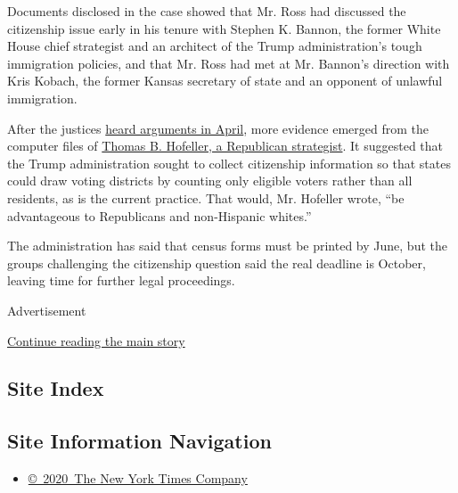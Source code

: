 Documents disclosed in the case showed that Mr. Ross had discussed the
citizenship issue early in his tenure with Stephen K. Bannon, the former
White House chief strategist and an architect of the Trump
administration's tough immigration policies, and that Mr. Ross had met
at Mr. Bannon's direction with Kris Kobach, the former Kansas secretary
of state and an opponent of unlawful immigration.

After the justices
\href{https://www.nytimes3xbfgragh.onion/2019/04/23/us/politics/supreme-court-census-citizenship.html}{heard
arguments in April}, more evidence emerged from the computer files of
\href{https://www.nytimes3xbfgragh.onion/2018/08/21/obituaries/thomas-hofeller-republican-master-of-political-maps-dies-at-75.html}{Thomas
B. Hofeller, a Republican strategist}. It suggested that the Trump
administration sought to collect citizenship information so that states
could draw voting districts by counting only eligible voters rather than
all residents, as is the current practice. That would, Mr. Hofeller
wrote, ``be advantageous to Republicans and non-Hispanic whites.''

The administration has said that census forms must be printed by June,
but the groups challenging the citizenship question said the real
deadline is October, leaving time for further legal proceedings.

Advertisement

\protect\hyperlink{after-bottom}{Continue reading the main story}

\hypertarget{site-index}{%
\subsection{Site Index}\label{site-index}}

\hypertarget{site-information-navigation}{%
\subsection{Site Information
Navigation}\label{site-information-navigation}}

\begin{itemize}
\tightlist
\item
  \href{https://help.nytimes3xbfgragh.onion/hc/en-us/articles/115014792127-Copyright-notice}{©~2020~The
  New York Times Company}
\end{itemize}

